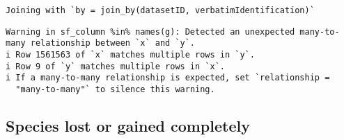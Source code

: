 \documentclass[
  letterpaper,
  DIV=11,
  numbers=noendperiod]{scrreprt}
\newenvironment{Shaded}{\begin{snugshade}}{\end{snugshade}}
\newcommand{\CommentTok}[1]{\textcolor[rgb]{0.37,0.37,0.37}{#1}}
\newcommand{\FunctionTok}[1]{\textcolor[rgb]{0.28,0.35,0.67}{#1}}
\newcommand{\NormalTok}[1]{\textcolor[rgb]{0.00,0.23,0.31}{#1}}
\newcommand{\OtherTok}[1]{\textcolor[rgb]{0.00,0.23,0.31}{#1}}
\newcommand{\SpecialCharTok}[1]{\textcolor[rgb]{0.37,0.37,0.37}{#1}}
\newcommand{\StringTok}[1]{\textcolor[rgb]{0.13,0.47,0.30}{#1}}
\begin{document}
\begin{verbatim}
Joining with `by = join_by(datasetID, verbatimIdentification)`
\end{verbatim}

\begin{verbatim}
Warning in sf_column %in% names(g): Detected an unexpected many-to-many relationship between `x` and `y`.
i Row 1561563 of `x` matches multiple rows in `y`.
i Row 9 of `y` matches multiple rows in `x`.
i If a many-to-many relationship is expected, set `relationship =
  "many-to-many"` to silence this warning.
\end{verbatim}

\begin{Shaded}
\end{Shaded}

\hypertarget{species-lost-or-gained-completely}{%
\subsection{Species lost or gained
completely}\label{species-lost-or-gained-completely}}
\end{document}
